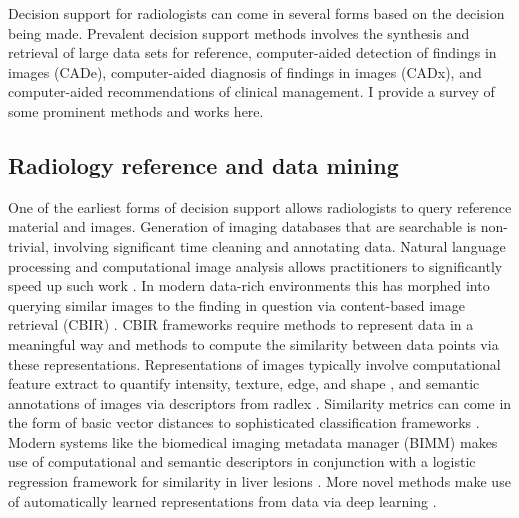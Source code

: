 Decision support for radiologists can come in several forms based on the decision being made. Prevalent decision support methods involves the synthesis and retrieval of large data sets for reference, computer-aided detection of findings in images (CADe), computer-aided diagnosis of findings in images (CADx), and computer-aided recommendations of clinical management. I provide a survey of some prominent methods and works here.

\subsection{Radiology reference and data mining}
One of the earliest forms of decision support allows radiologists to query reference material and images. Generation of imaging databases that are searchable is non-trivial, involving significant time cleaning and annotating data. Natural language processing and computational image analysis allows practitioners to significantly speed up such work  \cite{Depeursinge:2012ce, Bozkurt:2014jw,Nassif:2009du}. In modern data-rich environments this has morphed into querying similar images to the finding in question via content-based image retrieval (CBIR) \cite{Akgul:2011ey}. CBIR frameworks require methods to represent data in a meaningful way and methods to compute the similarity between data points via these representations. Representations of images typically involve computational feature extract to quantify intensity, texture, edge, and shape \cite{Strela:2002vq,Zhao:2005wb, Hong:2006ti,Manay:2006un,MRangayyan:2005td,Xu:2012bh}, and semantic annotations of images via descriptors from radlex \cite{Langlotz:2006jn}. Similarity metrics can come in the form of basic vector distances to sophisticated classification frameworks \cite{Akgul:2011ey}. Modern systems like the biomedical imaging metadata manager (BIMM) makes use of computational and semantic descriptors in conjunction with a logistic regression framework for similarity in liver lesions \cite{Korenblum:2011gx}. More novel methods make use of automatically learned representations from data via deep learning \cite{Shin:2015wl}. 

